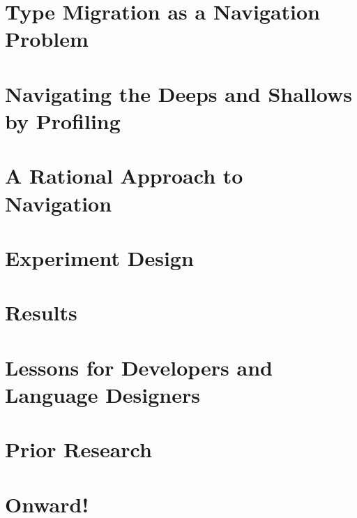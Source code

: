 \documentclass[acmsmall]{acmart}
\begin{document}
\def\sec#1#2{\section{#2} \label{sec:#1} }

\sec{intro}       {Type Migration as a Navigation Problem}
\sec{seascape}    {Navigating the Deeps and Shallows by Profiling}
\sec{ideas}       {A Rational Approach to Navigation}
\sec{experiment}  {Experiment Design}
\sec{results}     {Results}
\sec{discussion}  {Lessons for Developers and Language Designers}
\sec{related}     {Prior Research}
\sec{conclusion}  {Onward!}



\ifappendix{\appendix }{}
\clearpage



\end{document}
